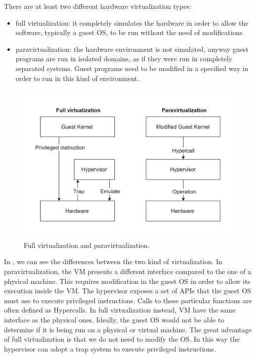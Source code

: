 There are at least two different hardware virtualization types:
\begin{itemize}
	\item full virtualization: it completely simulates the hardware in order to allow the software, typically a guest OS, to be run without the need of modifications
	\item paravirtualization: the hardware environment is not simulated, anyway guest programs are run in isolated domains, as if they were run in completely separated systems. Guest programs need to be modified in a specified way in order to run in this kind of environment.
\end{itemize}
\begin{figure}
	\centering
	\includegraphics[width=\columnwidth]{Images/virtualization_paravirtualization.pdf}  
	\caption[Full virtualization and paravirtualization]{Full virtualization and paravirtualization.}
	\label{fig:virtualizationParavirtualization}
\end{figure}

In , we can see the differences between the two kind
of virtualization. In paravirtualization, the VM presents a different interface compared to the one of a physical machine. This requires modification in the guest OS in order to allow its execution inside the VM. The hypervisor exposes a set of APIs that the guest OS must use to execute privileged instructions. Calls to these particular functions are often defined as Hypercalls. In full virtualization instead, VM have the same interface as the physical ones. Ideally, the guest OS would not be able to determine if it is being run on a physical or virtual machine. The great advantage of full virtualization is that we do not need to modify the OS. In this way the hypervisor can adopt a trap system to execute privileged instructions. 

